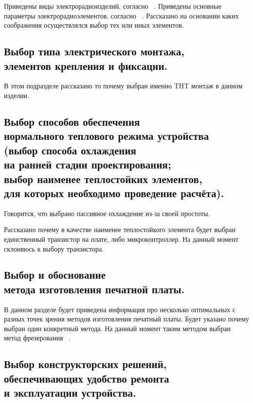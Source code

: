 \documentclass[a4paper]{bsuir-std}
\begin{document}
Приведены виды электрорадиоизделий, согласно ~\cite{Belyanin2008}.
Приведены основные параметры электрорадиоэлементов, согласно
~\cite{Alexeev2011}.
Рассказано на основании каких соображения осуществлялся выбор тех или
иных элементов.

\subsection{Выбор типа электрического монтажа,\\
  элементов крепления и фиксации. }

В этом подразделе рассказано то почему выбран именно THT монтаж в
данном изделии.

\subsection{Выбор способов обеспечения \\
  нормального теплового режима устройства \\
  (выбор способа охлаждения \\
  на ранней стадии проектирования;\\
  выбор наименее теплостойких элементов, \\
  для которых необходимо проведение расчёта). }

Говорится, что выбрано пассивное охлаждение из-за своей простоты.

Рассказано почему в качестве наименее теплостойкого элемента будет
выбран единственный транзистор на плате, либо микроконтроллер. На
данный момент склоняюсь к выбору транзистора.

\subsection{Выбор и обоснование \\
  метода изготовления печатной платы. }

В данном разделе будет приведена информация про несколько оптимальных
с разных точек зрения методов изготовления печатный платы. Будет
указано почему выбран один конкретный метода. На данный момент таким
методом выбран метод фрезерования ~\cite{PirogovaEngineering}.

\subsection{Выбор конструкторских решений, \\
  обеспечивающих удобство ремонта \\
  и эксплуатации устройства.}
\end{document}
